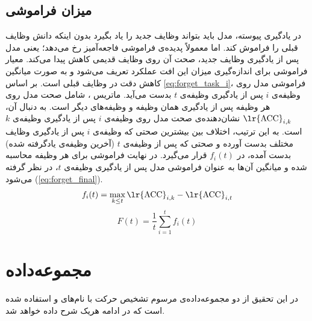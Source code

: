 \subsection{میزان فراموشی}
در یادگیری پیوسته، مدل باید بتواند وظایف جدید را یاد بگیرد بدون اینکه دانش وظایف قبلی را فراموش کند. اما معمولاً پدیده‌ی فراموشی فاجعه‌آمیز رخ می‌دهد؛ یعنی مدل پس از یادگیری وظایف جدید، صحت آن روی وظایف قدیمی کاهش پیدا می‌کند. معیار فراموشی برای اندازه‌گیری میزان این افت عملکرد تعریف می‌شود و به صورت میانگین کاهش دقت در وظایف قبلی است. بر اساس \eqref{eq:forget_task_i}، فراموشی مدل روی وظیفه‌ی $i$ پس از یادگیری وظیفه‌ی $t$ بدست می‌آید. ماتریس ، شامل صحت مدل روی هر وظیفه پس از یادگیری همان وظیفه و وظیفه‌های دیگر است. به دنبال آن، $\text{\lr{ACC}}_{i,k}$ نشان‌دهنده‌ی صحت مدل روی وظیفه‌ی $i$ پس از یادگیری وظیفه‌ی $k$ است. به این ترتیب، اختلاف بین بیشترین صحتی که وظیفه‌ی $i$ پس از یادگیری وظایف مختلف بدست آورده و صحتی که پس از وظیفه‌ی $t$ (آخرین وظیفه‌ی یادگرفته شده) بدست آمده، در $f_i(t)$ قرار می‌گیرد. در نهایت فراموشی برای هر وظیفه محاسبه شده و میانگین آن‌ها به عنوان فراموشی مدل پس از یادگیری وظیفه‌ی $t$، در نظر گرفته می‌شود (\eqref{eq:forget_final}). 
\begin{equation}\label{eq:forget_task_i}
	f_i(t) = \max_{k \le t} \text{\lr{ACC}}_{i,k} - \text{\lr{ACC}}_{i,t}
\end{equation}
\begin{equation}\label{eq:forget_final}
	F(t) = \frac{1}{t} \sum_{i=1}^{t} f_i(t) 
\end{equation}

\section{مجموعه‌داده}
در این تحقیق از دو مجموعه‌داده‌ی مرسوم تشخیص حرکت با نام‌های \cite{ucf101} و  \cite{hmdb51} استفاده شده است که در ادامه هریک شرح داده خواهد شد. 


